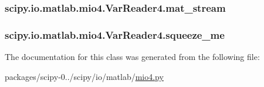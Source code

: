 \subsubsection[{mat\+\_\+stream}]{\setlength{\rightskip}{0pt plus 5cm}scipy.\+io.\+matlab.\+mio4.\+Var\+Reader4.\+mat\+\_\+stream}\label{classscipy_1_1io_1_1matlab_1_1mio4_1_1VarReader4_a58b0f9b147311fa79145de836352838d}
\hypertarget{classscipy_1_1io_1_1matlab_1_1mio4_1_1VarReader4_a62e5d144f224b514ed50b8ecf3600a7d}{}
\subsubsection[{squeeze\+\_\+me}]{\setlength{\rightskip}{0pt plus 5cm}scipy.\+io.\+matlab.\+mio4.\+Var\+Reader4.\+squeeze\+\_\+me}\label{classscipy_1_1io_1_1matlab_1_1mio4_1_1VarReader4_a62e5d144f224b514ed50b8ecf3600a7d}


The documentation for this class was generated from the following file\+:\begin{DoxyCompactItemize}
\item 
packages/scipy-\/0../scipy/io/matlab/\hyperlink{mio4_8py}{mio4.\+py}\end{DoxyCompactItemize}
